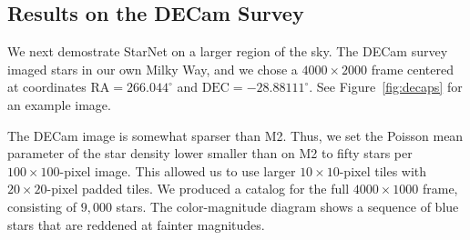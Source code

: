 \subsection{Results on the DECam Survey}
\label{sec:results_on_decam}

We next demostrate StarNet on a larger region of the sky.
The DECam survey imaged stars in our own Milky Way, and we chose
a $4000 \times 2000$ frame centered at coordinates $\text{RA} = 266.044^\circ$ and
$\text{DEC} = -28.88111^\circ$. See Figure~\ref{fig:decaps} for an example image.

The DECam image is somewhat sparser than M2.
Thus, we set the Poisson mean parameter of the star density lower smaller than on M2 to fifty stars per $100 \times 100$-pixel image.
This allowed us to use larger $10\times 10$-pixel tiles with $20\times20$-pixel
padded tiles. 
We produced
a catalog for the full $4000 \times 1000$ frame, consisting of $9,000$ stars. 
The color-magnitude diagram shows a sequence of blue
stars that are reddened at fainter magnitudes. 

